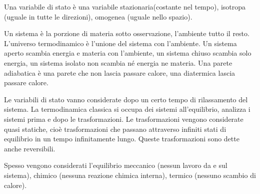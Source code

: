 Una variabile di stato è una variabile stazionaria(costante nel tempo), isotropa (uguale in tutte le direzioni), omogenea (uguale nello spazio).

Un sistema è la porzione di materia sotto osservazione, l'ambiente  tutto il resto. L'universo termodinamico è l'unione del sistema con l'ambiente. Un sistema aperto  scambia energia e materia con l'ambiente, un sistema chiuso  scambia solo energia, un sistema isolato non scambia né energia ne materia. Una parete adiabatica è una parete che non lascia passare calore, una diatermica lascia passare calore.

Le variabili di stato vanno considerate dopo un certo tempo di rilassamento del sistema. La termodinamica classica si occupa dei sistemi all'equilibrio, analizza i sistemi prima e dopo le trasformazioni. Le trasformazioni vengono considerate quasi statiche, cioè trasformazioni che passano attraverso infiniti stati di equilibrio in un tempo infinitamente lungo. Queste trasformazioni sono dette anche reversibili.

Spesso vengono considerati l'equilibrio meccanico (nessun lavoro da e sul sistema), chimico (nessuna reazione chimica interna), termico (nessuno scambio di calore).

